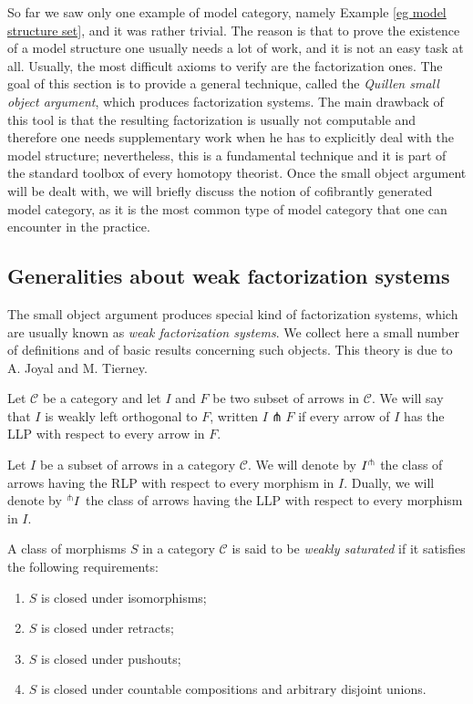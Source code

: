 \begin{refsection}
So far we saw only one example of model category, namely Example \ref{eg model structure set}, and it was rather trivial. The reason is that to prove the existence of a model structure one usually needs a lot of work, and it is not an easy task at all. Usually, the most difficult axioms to verify are the factorization ones. The goal of this section is to provide a general technique, called the \emph{Quillen small object argument}, which produces factorization systems. The main drawback of this tool is that the resulting factorization is usually not computable and therefore one needs supplementary work when he has to explicitly deal with the model structure; nevertheless, this is a fundamental technique and it is part of the standard toolbox of every homotopy theorist. Once the small object argument will be dealt with, we will briefly discuss the notion of cofibrantly generated model category, as it is the most common type of model category that one can encounter in the practice.

\subsection{Generalities about weak factorization systems}

The small object argument produces special kind of factorization systems, which are usually known as \emph{weak factorization systems}. We collect here a small number of definitions and of basic results concerning such objects. This theory is due to A. Joyal and M. Tierney.

\begin{defin}
Let $\mathcal C$ be a category and let $I$ and $F$ be two subset of arrows in $\mathcal C$. We will say that $I$ is weakly left orthogonal to $F$, written $I \pitchfork F$ if every arrow of $I$ has the LLP with respect to every arrow in $F$.
\end{defin}

\begin{defin}
Let $I$ be a subset of arrows in a category $\mathcal C$. We will denote by $I^{\pitchfork}$ the class of arrows having the RLP with respect to every morphism in $I$. Dually, we will denote by ${}^{\pitchfork}I$ the class of arrows having the LLP with respect to every morphism in $I$.
\end{defin}

\begin{defin}
A class of morphisms $S$ in a category $\mathcal C$ is said to be \emph{weakly saturated} if it satisfies the following requirements:
\begin{enumerate}
\item $S$ is closed under isomorphisms;
\item $S$ is closed under retracts;
\item $S$ is closed under pushouts;
\item $S$ is closed under countable compositions and arbitrary disjoint unions.
\end{enumerate}
\end{defin}


\end{refsection}

